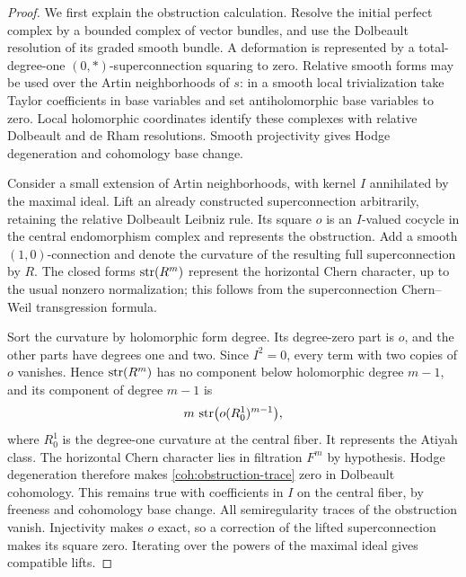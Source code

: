 \begin{proof}
We first explain the obstruction calculation.  Resolve the initial
perfect complex by a bounded complex of vector bundles, and use the
Dolbeault resolution of its graded smooth bundle.  A deformation is
represented by a total-degree-one \((0,*)\)-superconnection squaring
to zero.  Relative smooth forms may be used over the Artin
neighborhoods of \(s\): in a smooth local trivialization take Taylor
coefficients in base variables and set antiholomorphic base variables
to zero.  Local holomorphic coordinates identify these complexes with
relative Dolbeault and de Rham resolutions.  Smooth projectivity gives
Hodge degeneration and cohomology base change.

Consider a small extension of Artin neighborhoods, with kernel \(I\)
annihilated by the maximal ideal.  Lift an already constructed
superconnection arbitrarily, retaining the relative Dolbeault Leibniz
rule.  Its square \(o\) is an \(I\)-valued cocycle in the central
endomorphism complex and represents the obstruction.  Add a smooth
\((1,0)\)-connection and denote the curvature of the resulting full
superconnection by \(R\).  The closed forms \(\operatorname{str}(R^m)\) represent
the horizontal Chern character, up to the usual nonzero normalization;
this follows from the superconnection Chern--Weil transgression
formula.

Sort the curvature by holomorphic form degree.  Its degree-zero part
is \(o\), and the other parts have degrees one and two.  Since
\(I^2=0\), every term with two copies of \(o\) vanishes.  Hence
\(\operatorname{str}(R^m)\) has no component below holomorphic degree \(m-1\),
and its component of degree \(m-1\) is
\begin{equation}\label{coh:obstruction-trace}
 m\,\operatorname{str}\bigl(o(R^1_0)^{m-1}\bigr),
\end{equation}
where \(R^1_0\) is the degree-one curvature at the central fiber.
It represents the Atiyah class.  The horizontal Chern character lies
in filtration \(F^m\) by hypothesis.  Hodge degeneration therefore
makes \eqref{coh:obstruction-trace} zero in Dolbeault cohomology.
This remains true with coefficients in \(I\) on the central fiber,
by freeness and cohomology base change.  All semiregularity traces of
the obstruction vanish.  Injectivity makes \(o\) exact, so a
correction of the lifted superconnection makes its square zero.
Iterating over the powers of the maximal ideal gives compatible lifts.


\end{proof}

